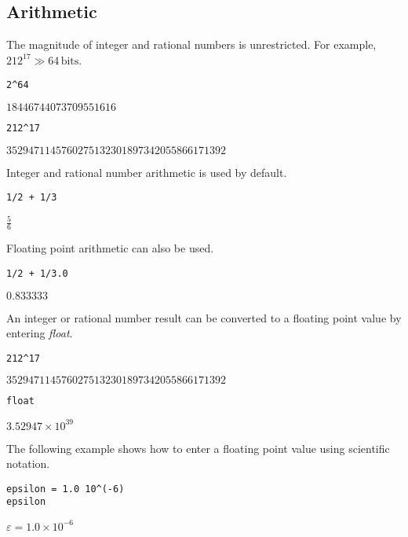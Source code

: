 \subsection{Arithmetic}

\noindent
The magnitude of integer and rational numbers is unrestricted.
For example, $212^{17}\gg64\,\text{bits}$.

\begin{Verbatim}[formatcom=\color{blue}]
2^64
\end{Verbatim}

\noindent
$\displaystyle 18446744073709551616$

\begin{Verbatim}[formatcom=\color{blue}]
212^17
\end{Verbatim}

\noindent
$\displaystyle 3529471145760275132301897342055866171392$

\bigskip
\noindent
Integer and rational number arithmetic is used by default.

\begin{Verbatim}[formatcom=\color{blue}]
1/2 + 1/3
\end{Verbatim}

\noindent
$\displaystyle \tfrac{5}{6}$

\bigskip
\noindent
Floating point arithmetic can also be used.

\begin{Verbatim}[formatcom=\color{blue}]
1/2 + 1/3.0
\end{Verbatim}

\noindent
$\displaystyle 0.833333$

\bigskip
\noindent
An integer or rational number result can be converted to a floating
point value by entering {\it float}.

\begin{Verbatim}[formatcom=\color{blue}]
212^17
\end{Verbatim}

\noindent
$\displaystyle 3529471145760275132301897342055866171392$

\begin{Verbatim}[formatcom=\color{blue}]
float
\end{Verbatim}

\noindent
$\displaystyle 3.52947\times10^{39}$

\bigskip
\noindent
The following example shows how to enter a floating point value
using scientific notation.

\begin{Verbatim}[formatcom=\color{blue}]
epsilon = 1.0 10^(-6)
epsilon
\end{Verbatim}

\noindent
$\displaystyle \varepsilon=1.0\times10^{-6}$
